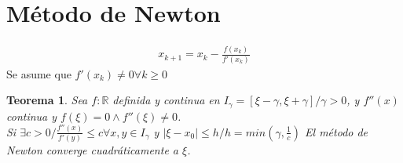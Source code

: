 \documentclass{article}
\newtheorem{theo}{Teorema}
\begin{document}
\section{Método de Newton}
\begin{equation}
    \begin{split}
        \boxed{x_{k+1} = x_{k} - \frac{f(x_{k})}{f'(x_{k})}}
    \end{split}
\end{equation}
Se asume que $f'(x_{k})\neq 0 \forall k \geq 0$
\begin{theo}
    Sea $f: \mathbb{R}$ definida y continua en $I_{\gamma }= [\xi -\gamma , \xi +\gamma ] / \gamma  > 0$, y $f''(x)$ continua 
    y $f(\xi ) = 0 \wedge f''(\xi ) \neq 0$.\\
    Si $\exists c>0 / \frac{f''(x)}{f'(y)} \leq c \forall x,y \in I_{\gamma }$ y $\lvert \xi -x_{0} \rvert \leq h / h=min(\gamma ,\frac{1}{c})$
    El método de Newton converge cuadráticamente a $\xi $.
\end{theo}
\end{document}
